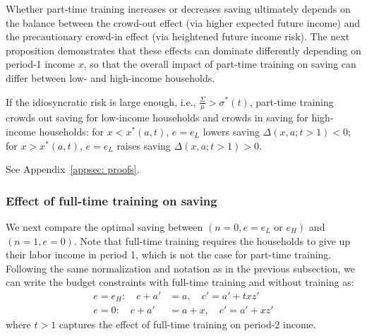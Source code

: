 \documentclass[12pt,english]{article}
\makeatletter
\numberwithin{equation}{section}
\renewenvironment{proof}[1][\proofname]{\par
    \pushQED{\qed}%
    \normalfont \topsep2\p@\@plus6\p@\relax
    \trivlist
    \item\relax
    {\itshape #1\@addpunct{.}}\hspace\labelsep\ignorespaces
}{%
    \popQED\endtrivlist\@endpefalse
}
\makeatother
\begin{document}
Whether part-time training increases or decreases saving ultimately depends on the balance between the crowd-out effect (via higher expected future income) and the precautionary crowd-in effect (via heightened future income risk). The next proposition demonstrates that these effects can dominate differently depending on period-1 income $x$, so that the overall impact of part-time training on saving can differ between low- and high-income households.



\begin{proposition}\label{prop:dadt}
    If the idiosyncratic risk is large enough, i.e., $\frac{\Sigma}{\mu}>\sigma^*(t)$, part-time training crowds out saving for low-income households and crowds in saving for high-income households: 
    for $x<x^\ast(a,t)$, $e=e_L$ lowers saving $\Delta(x,a;t>1)<0$; for $x>x^\ast(a,t)$, $e=e_L$ raises saving $\Delta(x,a;t>1)>0$.
\end{proposition}
\begin{proof}
    See Appendix~\ref{appsec: proofs}.
\end{proof}



\subsubsection{Effect of full-time training on saving}
We next compare the optimal saving between $(n=0,e=e_L \text{ or } e_H)$ and $(n=1,e=0)$. Note that  full-time training requires the households to give up their labor income in period 1, which is not the case for part-time training. Following the same normalization and notation as in the previous subsection, we can write the budget constraints with full-time training and without training as:
\begin{align}
e=e_H: \quad c + a' &= a, \quad c' = a' + txz'\\
e=0: \quad c + a' &= a + x, \quad c' = a' + xz'
\end{align}
where $t>1$ captures the effect of full-time training on period-2 income. 
\end{document}
